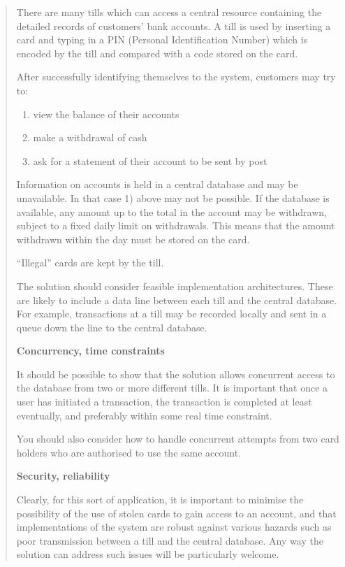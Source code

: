 \documentclass[\pformat,12pt,twoside]{article}
\begin{document}
\begin{quote}
There are many tills which can access a central resource containing
the detailed records of customers' bank accounts. A till is used by
inserting a card and typing in a PIN (Personal Identification Number)
which is encoded by the till and compared with a code stored on the
card.

After successfully identifying themselves to the system, customers may
try to:

\begin{enumerate}
\item view the balance of their accounts
\item make a withdrawal of cash
\item ask for a statement of their account to be sent by post
\end{enumerate}

Information on accounts is held in a central database and may be
unavailable. In that case 1) above may not be possible. If the
database is available, any amount up to the total in the account may
be withdrawn, subject to a fixed daily limit on withdrawals. This
means that the amount withdrawn within the day must be stored on the
card.

``Illegal'' cards are kept by the till.

The solution should consider feasible implementation
architectures. These are likely to include a data line between each
till and the central database. For example, transactions at a till may
be recorded locally and sent in a queue down the line to the central
database.

\textbf{Concurrency, time constraints}

It should be possible to show that the solution allows concurrent access
to the database from two or more different tills. It is important that
once a user has initiated a transaction, the transaction is completed
at least eventually, and preferably within some real time constraint.

You should also consider how to handle concurrent attempts from two
card holders who are authorised to use the same account.

\textbf{Security, reliability}

Clearly, for this sort of application, it is important to minimise the
possibility of the use of stolen cards to gain access to an account,
and that implementations of the system are robust against various
hazards such as poor transmission between a till and the central
database. Any way the solution can address such issues will be
particularly welcome.
\end{quote}
\end{document}

